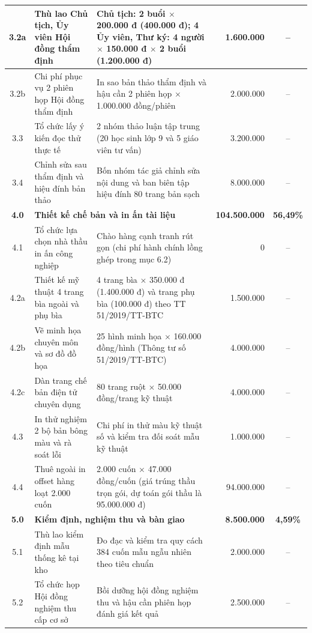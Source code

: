 \begin{center}
{\begin{longtable}{|c|p{4.5cm}|p{5.5cm}|r|c|}
\hline
3.2a & Thù lao Chủ tịch, Ủy viên Hội đồng thẩm định & Chủ tịch: 2 buổi $\times$ 200.000 đ (400.000 đ); 4 Ủy viên, Thư ký: 4 người $\times$ 150.000 đ $\times$ 2 buổi (1.200.000 đ) & 1.600.000 & -- \\
\hline
3.2b & Chi phí phục vụ 2 phiên họp Hội đồng thẩm định & In sao bản thảo thẩm định và hậu cần 2 phiên họp $\times$ 1.000.000 đồng/phiên & 2.000.000 & -- \\
\hline
3.3 & Tổ chức lấy ý kiến đọc thử thực tế & 2 nhóm thảo luận tập trung (20 học sinh lớp 9 và 5 giáo viên tư vấn) & 3.200.000 & -- \\
\hline
3.4 & Chỉnh sửa sau thẩm định và hiệu đính bản thảo & Bốn nhóm tác giả chỉnh sửa nội dung và ban biên tập hiệu đính 80 trang bản sạch & 8.000.000 & -- \\
\hline
\textbf{4.0} & \multicolumn{2}{l|}{\textbf{Thiết kế chế bản và in ấn tài liệu}} & \textbf{104.500.000} & \textbf{56,49\%} \\
\hline
4.1 & Tổ chức lựa chọn nhà thầu in ấn công nghiệp & Chào hàng cạnh tranh rút gọn (chi phí hành chính lồng ghép trong mục 6.2) & 0 & -- \\
\hline
4.2a & Thiết kế mỹ thuật 4 trang bìa ngoài và phụ bìa & 4 trang bìa $\times$ 350.000 đ (1.400.000 đ) và trang phụ bìa (100.000 đ) theo TT 51/2019/TT-BTC & 1.500.000 & -- \\
\hline
4.2b & Vẽ minh họa chuyên môn và sơ đồ đồ họa & 25 hình minh họa $\times$ 160.000 đồng/hình (Thông tư số 51/2019/TT-BTC) & 4.000.000 & -- \\
\hline
4.2c & Dàn trang chế bản điện tử chuyên dụng & 80 trang ruột $\times$ 50.000 đồng/trang kỹ thuật & 4.000.000 & -- \\
\hline
4.3 & In thử nghiệm 2 bộ bản bông màu và rà soát lỗi & Chi phí in thử màu kỹ thuật số và kiểm tra đối soát mẫu kỹ thuật & 1.000.000 & -- \\
\hline
4.4 & Thuê ngoài in offset hàng loạt 2.000 cuốn & 2.000 cuốn $\times$ 47.000 đồng/cuốn (giá trúng thầu trọn gói, dự toán gói thầu là 95.000.000 đ) & 94.000.000 & -- \\
\hline
\textbf{5.0} & \multicolumn{2}{l|}{\textbf{Kiểm định, nghiệm thu và bàn giao}} & \textbf{8.500.000} & \textbf{4,59\%} \\
\hline
5.1 & Thù lao kiểm định mẫu thống kê tại kho & Đo đạc và kiểm tra quy cách 384 cuốn mẫu ngẫu nhiên theo tiêu chuẩn & 2.000.000 & -- \\
\hline
5.2 & Tổ chức họp Hội đồng nghiệm thu cấp cơ sở & Bồi dưỡng hội đồng nghiệm thu và hậu cần phiên họp đánh giá kết quả & 2.500.000 & -- \\

\end{longtable}}
\end{center}

